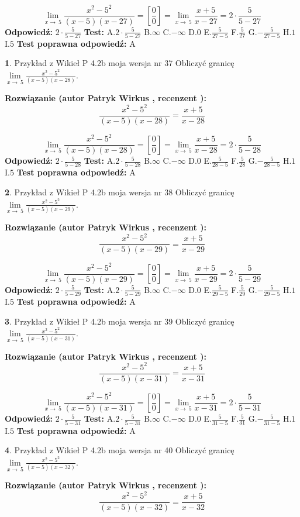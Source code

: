 \documentclass[12pt, a4paper]{article}
\theoremstyle{definition} %
\newtheorem{zad}{}
\newcommand{\zadStart}[1]{\begin{zad}#1\newline}
\newcommand{\zadStop}{\end{zad}}
\newcommand{\rozwStart}[2]{\noindent \textbf{Rozwiązanie (autor #1 , recenzent #2): }\newline}
\newcommand{\rozwStop}{\newline}
\newcommand{\odpStart}{\noindent \textbf{Odpowiedź:}\newline}
\newcommand{\odpStop}{\newline}
\newcommand{\testStart}{\noindent \textbf{Test:}\newline}
\newcommand{\testStop}{\newline}
\newcommand{\kluczStart}{\noindent \textbf{Test poprawna odpowiedź:}\newline}
\newcommand{\kluczStop}{\newline}
\begin{document}
$$\lim\limits_{x\to\ 5}\frac{x^{2}-5^{2}}{(x-5)(x-27)}=[\frac{0}{0}]=\lim\limits_{x\to\ 5}\frac{x+5}{x-27}=2 \cdot \frac{5}{5-27}$$
\rozwStop
\odpStart
$2 \cdot \frac{5}{5-27}$
\odpStop
\testStart
A.$2 \cdot \frac{5}{5-27}$
B.$\infty$
C.$-\infty$
D.$0$
E.$\frac{5}{27-5}$
F.$\frac{5}{27}$
G.$-\frac{5}{27-5}$
H.$1$
I.$5$
\testStop
\kluczStart
A
\kluczStop



\zadStart{Przykład z Wikieł P 4.2b moja wersja nr 37}
Obliczyć granicę $\lim\limits_{x\to\ 5}\frac{x^{2}-5^{2}}{(x-5)(x-28)}$.
\zadStop
\rozwStart{Patryk Wirkus}{}
$$\frac{x^{2}-5^{2}}{(x-5)(x-28)}=\frac{x+5}{x-28}$$

$$\lim\limits_{x\to\ 5}\frac{x^{2}-5^{2}}{(x-5)(x-28)}=[\frac{0}{0}]=\lim\limits_{x\to\ 5}\frac{x+5}{x-28}=2 \cdot \frac{5}{5-28}$$
\rozwStop
\odpStart
$2 \cdot \frac{5}{5-28}$
\odpStop
\testStart
A.$2 \cdot \frac{5}{5-28}$
B.$\infty$
C.$-\infty$
D.$0$
E.$\frac{5}{28-5}$
F.$\frac{5}{28}$
G.$-\frac{5}{28-5}$
H.$1$
I.$5$
\testStop
\kluczStart
A
\kluczStop



\zadStart{Przykład z Wikieł P 4.2b moja wersja nr 38}
Obliczyć granicę $\lim\limits_{x\to\ 5}\frac{x^{2}-5^{2}}{(x-5)(x-29)}$.
\zadStop
\rozwStart{Patryk Wirkus}{}
$$\frac{x^{2}-5^{2}}{(x-5)(x-29)}=\frac{x+5}{x-29}$$

$$\lim\limits_{x\to\ 5}\frac{x^{2}-5^{2}}{(x-5)(x-29)}=[\frac{0}{0}]=\lim\limits_{x\to\ 5}\frac{x+5}{x-29}=2 \cdot \frac{5}{5-29}$$
\rozwStop
\odpStart
$2 \cdot \frac{5}{5-29}$
\odpStop
\testStart
A.$2 \cdot \frac{5}{5-29}$
B.$\infty$
C.$-\infty$
D.$0$
E.$\frac{5}{29-5}$
F.$\frac{5}{29}$
G.$-\frac{5}{29-5}$
H.$1$
I.$5$
\testStop
\kluczStart
A
\kluczStop



\zadStart{Przykład z Wikieł P 4.2b moja wersja nr 39}
Obliczyć granicę $\lim\limits_{x\to\ 5}\frac{x^{2}-5^{2}}{(x-5)(x-31)}$.
\zadStop
\rozwStart{Patryk Wirkus}{}
$$\frac{x^{2}-5^{2}}{(x-5)(x-31)}=\frac{x+5}{x-31}$$

$$\lim\limits_{x\to\ 5}\frac{x^{2}-5^{2}}{(x-5)(x-31)}=[\frac{0}{0}]=\lim\limits_{x\to\ 5}\frac{x+5}{x-31}=2 \cdot \frac{5}{5-31}$$
\rozwStop
\odpStart
$2 \cdot \frac{5}{5-31}$
\odpStop
\testStart
A.$2 \cdot \frac{5}{5-31}$
B.$\infty$
C.$-\infty$
D.$0$
E.$\frac{5}{31-5}$
F.$\frac{5}{31}$
G.$-\frac{5}{31-5}$
H.$1$
I.$5$
\testStop
\kluczStart
A
\kluczStop



\zadStart{Przykład z Wikieł P 4.2b moja wersja nr 40}
Obliczyć granicę $\lim\limits_{x\to\ 5}\frac{x^{2}-5^{2}}{(x-5)(x-32)}$.
\zadStop
\rozwStart{Patryk Wirkus}{}
$$\frac{x^{2}-5^{2}}{(x-5)(x-32)}=\frac{x+5}{x-32}$$
\end{document}
